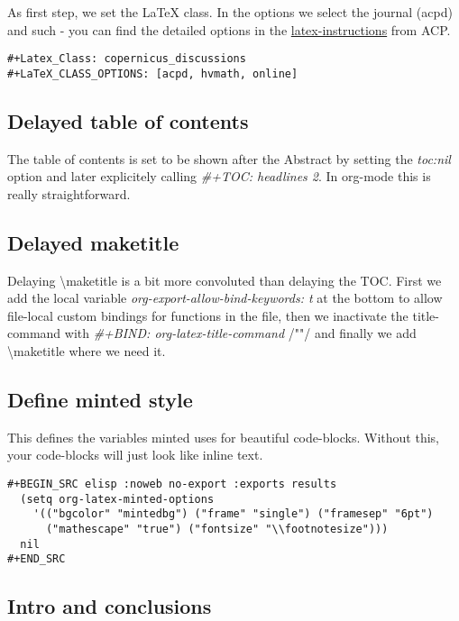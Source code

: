 \documentclass[11pt]{article}
\begin{document}
As first step, we set the \LaTeX{} class. In the options we select the journal (acpd) and such - you can find the detailed options in the \href{http://www.atmospheric-chemistry-and-physics.net/submission/latex_instructions.html}{latex-instructions} from ACP.

\begin{verbatim}
#+Latex_Class: copernicus_discussions
#+LaTeX_CLASS_OPTIONS: [acpd, hvmath, online]
\end{verbatim}

\subsection*{Delayed table of contents}
\label{sec-3-2}

The table of contents is set to be shown after the Abstract by setting the \emph{toc:nil} option and later explicitely calling \emph{\#+TOC: headlines 2}. In org-mode this is really straightforward.

\subsection*{Delayed maketitle}
\label{sec-3-3}

Delaying \textbackslash maketitle is a bit more convoluted than delaying the TOC. First we add the local variable \emph{org-export-allow-bind-keywords: t} at the bottom to allow file-local custom bindings for functions in the file, then we inactivate the title-command with \emph{\#+BIND: org-latex-title-command} /""/ and finally we add \textbackslash maketitle where we need it.

\subsection*{Define minted style}
\label{sec-3-4}

This defines the variables minted uses for beautiful code-blocks. Without this, your code-blocks will just look like inline text.

\begin{verbatim}
#+BEGIN_SRC elisp :noweb no-export :exports results
  (setq org-latex-minted-options
    '(("bgcolor" "mintedbg") ("frame" "single") ("framesep" "6pt") 
      ("mathescape" "true") ("fontsize" "\\footnotesize")))
  nil
#+END_SRC
\end{verbatim}

\subsection*{Intro and conclusions}
\label{sec-3-5}
\end{document}
